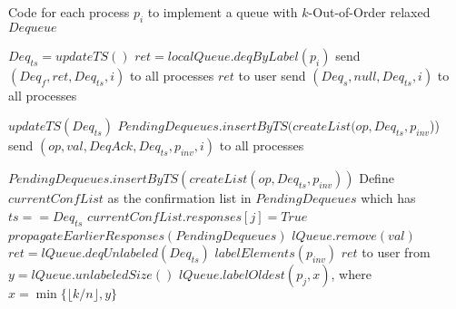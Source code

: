 \documentclass[a4paper,anonymous,USenglish]{lipics-v2021}
\theoremstyle{definition}
\begin{document}
\begin{algorithm}
  \caption{Code for each process $p_i$ to implement a queue with $k$-Out-of-Order relaxed $Dequeue$}\label{alg:relaxed}
  \begin{algorithmic}[1]
      \State $Deq_{ts} = updateTS()$
      \label{oooline:checkFast}
        \State $ret = localQueue.deqByLabel(p_i)$ \label{oooline:fastDeq}
        \State send $(Deq_f, ret, Deq_{ts}, i)$ to all processes
        \State \Return $ret$ to user \label{oooline:fastDeqResponse}
      \Else
        \State send $(Deq_s, null, Deq_{ts}, i)$ to all processes
      \EndIf
    \EndFunction

      \State $updateTS(Deq_{ts})$
        \State $PendingDequeues.insertByTS(createList(op, Deq_{ts}, p_{inv}$))
      \EndIf
      \State send $(op, val, DeqAck, Deq_{ts}, p_{inv}, i)$ to all processes
    \EndFunction

        \State $PendingDequeues.insertByTS(createList(op, Deq_{ts}, p_{inv}))$
      \EndIf
      \State Define $currentConfList$ as the confirmation list in $PendingDequeues$ which has $ts == Deq_{ts}$
      \State $currentConfList.responses[j] = True$
      \State $propagateEarlierResponses(PendingDequeues)$ 
        \label{oooline:localExec}
             $lQueue.remove(val)$\EndIf
          \Else    
              \State $ret = lQueue.deqUnlabeled(Deq_{ts})$ \label{oooline:sDeqChooseUnlabeled}
            \State $labelElements(p_{inv})$\label{oooline:label}
              \State \Return $ret$ to user
            \EndIf
          \EndIf 
        \EndIf 
      \EndFor
      \EndFunction
%
       from \cite{TalmageWelch14}
      \State $y = lQueue.unlabeledSize()$
      \State $lQueue.labelOldest(p_j,x)$, where $x = \min\{\lfloor k/n\rfloor, y\}$\label{oooline:labelOldest}
      \EndFunction
  \end{algorithmic}
\end{algorithm}
\end{document}
